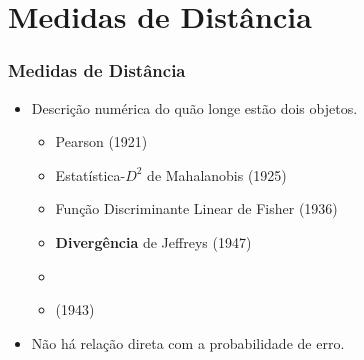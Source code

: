 \documentclass{beamer}
\begin{document}
\section{Medidas de Distância}
  		
\begin{comment}

\begin{frame}
  	\frametitle{Medida de Distância}
  	\begin{itemize}
  		\setlength\itemsep{1em}
  		\item Descrição numérica do quão longe estão dois objetos.
  		\item Obedece às condições:
  		\begin{itemize}
  			\item $d(x,y) \geq 0$.
	  		\item $d(x,y) = 0, x = y$.
	  		\item $d(x,y) = d(y,x)$.
	  		\item $d(x,z) \leq d(x,y) + d(y,z)$.
  		\end{itemize}
  		
		\item Não há medidas de distância que têm esta relação direta com a probabilidade de erro.	
  	\end{itemize}
\end{frame}

\end{comment}

\begin{frame}
  	\frametitle{Medidas de Distância}
  	\begin{itemize}
  		\setlength\itemsep{1em}
  		\item Descrição numérica do quão longe estão dois objetos.
  		\begin{itemize}
  			\item Pearson (1921)
  			\item Estatística-$D^2$ de Mahalanobis (1925)
  			\item Função Discriminante Linear de Fisher (1936)
  			\item \textbf{Divergência} de Jeffreys (1947)
  			\item[]
  			\item {} (1943)
  		\end{itemize}
  		\item Não há relação direta com a probabilidade de erro.	
  	\end{itemize}
\end{frame}
\end{document}
